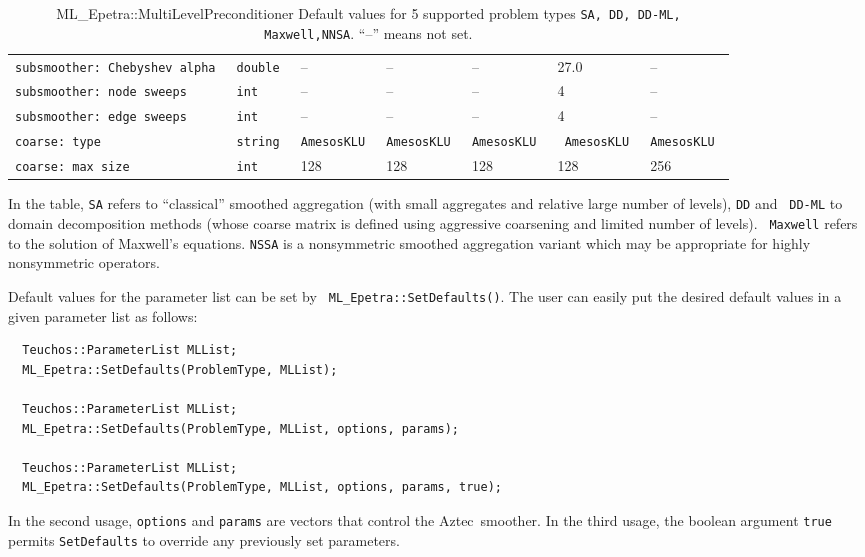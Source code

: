 \documentclass{article}[11pt]
\newcommand{\Aztec}  {{\sc Aztec}}
\begin{document}
\begin{table}
\begin{tabular}{| p{6.5cm} | p{1.3cm} | p{2.5cm} | p{2.1cm} | p{2.1cm} | p{2.5cm} | p{2.2cm} |}
\tt subsmoother: Chebyshev alpha & \tt double & -- & -- & -- & 27.0 & -- \\
\tt subsmoother: node sweeps & \tt int & -- & -- & -- & 4 & -- \\
\tt subsmoother: edge sweeps & \tt int & -- & -- & -- & 4 & -- \\
\hline
\hline
\tt coarse: type & \tt string & \tt Amesos\-KLU & \tt Amesos\-KLU  & \tt Amesos\-KLU  & \tt
Amesos\-KLU & \tt Amesos\-KLU \\
\tt coarse: max size & \tt int & 128 & 128 & 128 & 128 & 256 \\
\hline
  \end{tabular}
  \caption{ML\_Epetra::MultiLevelPreconditioner Default values for
    5 supported problem types {\tt SA, DD, DD-ML, Maxwell,NNSA}. 
    ``--'' means not set.}
  \label{tab:default}
\end{table}
%
In the table, {\tt SA} refers to ``classical'' smoothed aggregation (with
small aggregates and relative large number of levels), {\tt DD} and {\tt
  DD-ML} to domain decomposition methods (whose coarse matrix is defined
using aggressive coarsening and limited number of levels).  {\tt
  Maxwell} refers to the solution of Maxwell's equations.  {\tt NSSA} 
is a nonsymmetric smoothed aggregation variant which may be appropriate for highly
nonsymmetric operators.

Default values for the parameter list can be set by {\tt
  ML\_Epetra::SetDefaults()}.  The user can easily put the desired
default values in a given parameter list as follows:
\begin{verbatim}
  Teuchos::ParameterList MLList;
  ML_Epetra::SetDefaults(ProblemType, MLList);

  Teuchos::ParameterList MLList;
  ML_Epetra::SetDefaults(ProblemType, MLList, options, params);

  Teuchos::ParameterList MLList;
  ML_Epetra::SetDefaults(ProblemType, MLList, options, params, true);
\end{verbatim}
%
In the second usage, {\tt options} and {\tt params} are vectors that control
the \Aztec\ smoother.  In the third usage, the boolean argument {\tt true}
permits {\tt SetDefaults} to override any previously set parameters.
\end{document}

